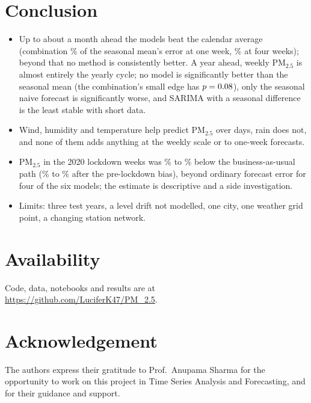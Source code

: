\documentclass[11pt,a4paper,twoside,twocolumn]{extarticle}
\newcommand{\pmtwo}{PM$_{2.5}$}
\begin{document}
\section{Conclusion}
\begin{itemize}\setlength\itemsep{0pt}\setlength\topsep{2pt}
 \item Up to about a month ahead the models beat the calendar average (combination \horPctCombOne\% of the seasonal mean's error at one week, \horPctCombFour\% at four weeks); beyond that no method is consistently better. A year ahead, weekly \pmtwo{} is almost entirely the yearly cycle; no model is significantly better than the seasonal mean (the combination's small edge has $p=0.08$), only the seasonal naive forecast is significantly worse, and SARIMA with a seasonal difference is the least stable with short data.
 \item Wind, humidity and temperature help predict \pmtwo{} over days, rain does not, and none of them adds anything at the weekly scale or to one-week forecasts.
 \item \pmtwo{} in the 2020 lockdown weeks was \lockGapMax\% to \lockGapMin\% below the business-as-usual path (\lockAdjMax\% to \lockAdjMin\% after the pre-lockdown bias), beyond ordinary forecast error for four of the six models; the estimate is descriptive and a side investigation.
 \item Limits: three test years, a level drift not modelled, one city, one weather grid point, a changing station network.
\end{itemize}

\section{Availability}
Code, data, notebooks and results are at \url{https://github.com/LuciferK47/PM_2.5}.

\section{Acknowledgement}
The authors express their gratitude to Prof.\ Anupama Sharma for the opportunity to work on this project in Time Series Analysis and Forecasting, and for their guidance and support.
\end{document}
